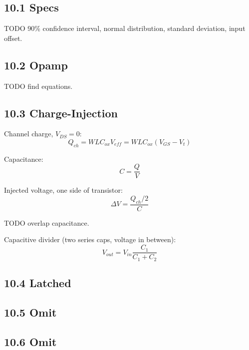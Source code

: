 \subsection{10.1 Specs}
  TODO 90\% confidence interval, normal distribution, standard deviation,
  input offset.
\subsection{10.2 Opamp}
  TODO find equations.
\subsection{10.3 Charge-Injection}
  Channel charge, $V_{DS} = 0$:
  \begin{equation}
    Q_{ch} = W L C_{ox} V_{eff}
           = W L C_{ox} (V_{GS} - V_t)
  \end{equation}

  Capacitance:
  \begin{equation}
    C = \frac{Q}{V}
  \end{equation}

  Injected voltage, one side of transistor:
  \begin{equation}
    \Delta V = \frac{Q_{ch} / 2}{C}
  \end{equation}

  TODO overlap capacitance.

  Capacitive divider (two series caps, voltage in between):
  \begin{equation}
    V_{out} = V_{in} \frac{C_1}{C_1 + C_2}
  \end{equation}
\subsection{10.4 Latched}
\subsection{10.5 Omit}
\subsection{10.6 Omit}
